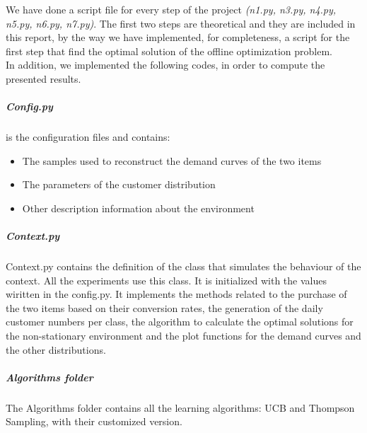 We have done a script file for every step of the project \textit{(n1.py, n3.py, n4.py, n5.py, n6.py, n7.py)}. The first two steps are theoretical and they are included in this report, by the way we have implemented, for completeness, a script for the first step that find the optimal solution of the offline optimization problem.\\
In addition, we implemented the following codes, in order to compute the presented results. 
\subparagraph*{Config.py} is the configuration files and contains:
\begin{itemize}
	\item The samples used to reconstruct the demand curves of the two items
	\item The parameters of the customer distribution
	\item Other description information about the environment
\end{itemize} 

\subparagraph*{Context.py}
Context.py contains the definition of the class that simulates the behaviour of the context. All the experiments use this class. It is initialized with the values wiritten in the config.py. It implements the methods related to the purchase of the two items based on their conversion rates, the generation of the daily customer numbers per class, the algorithm to calculate the optimal solutions for the non-stationary environment and the plot functions for the demand curves and the other distributions.


\subparagraph*{Algorithms folder}
The Algorithms folder contains all the learning algorithms: UCB and Thompson Sampling, with their customized version.